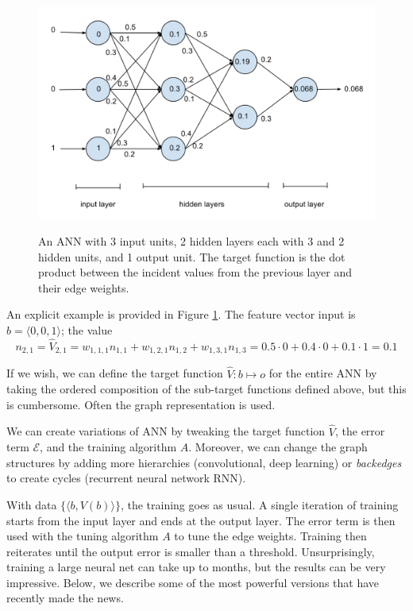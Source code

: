 \documentclass[12pt]{article}  %
\begin{document}
\begin{figure}
\centering
\includegraphics[scale=0.5]{images/ANN.png}\\
\caption{An ANN with 3 input units, 2 hidden layers each with 3 and 2 hidden units, and 1 output unit. The target function is the dot product between the incident values from the previous layer and their edge weights.}\label{ANN-fig}
\end{figure}

An explicit example is provided in Figure \ref{ANN-fig}. The feature vector input is $b = \langle 0,0,1 \rangle$; the value $$n_{2,1} = \hat{V}_{2,1} = w_{1,1,1}n_{1,1} + w_{1,2,1}n_{1,2} + w_{1,3,1}n_{1,3} = 0.5 \cdot 0 + 0.4 \cdot 0 + 0.1 \cdot 1 = 0.1$$

If we wish, we can define the target function $\hat{V} : b \mapsto o$ for the entire ANN by taking the ordered composition of the sub-target functions defined above, but this is cumbersome. Often the graph representation is used.

We can create variations of ANN by tweaking the target function $\hat{V}$, the error term $\mathcal{E}$, and the training algorithm $A$. Moreover, we can change the graph structures by adding more hierarchies (convolutional, deep learning) or {\em backedges} to create cycles (recurrent neural network RNN).

With data $\{\langle b, V(b) \rangle\}$, the training goes as usual. A single iteration of training starts from the input layer and ends at the output layer. The error term is then used with the tuning algorithm $A$ to tune the edge weights. Training then reiterates until the output error is smaller than a threshold. Unsurprisingly, training a large neural net can take up to months, but the results can be very impressive. Below, we describe some of the most powerful versions that have recently made the news.
\end{document}
